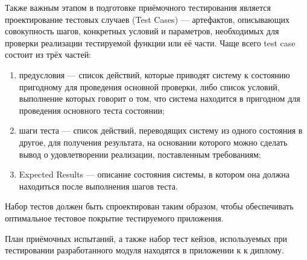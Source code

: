 Также важным этапом в подготовке приёмочного тестирования является проектирование тестовых случаев (Test Cases) ---
артефактов, описывающих совокупность шагов, конкретных условий и параметров, необходимых для проверки реализации
тестируемой функции или её части. Чаще всего test case состоит из трёх частей:

\begin{enumerate}
\item предусловия --- список действий, которые приводят систему к состоянию пригодному для проведения основной
проверки, либо список условий, выполнение которых говорит о том, что система находится в пригодном для проведения
основного теста состоянии;
\item шаги теста --- список действий, переводящих систему из одного состояния в другое, для получения
результата, на основании которого можно сделать вывод о удовлетворении реализации, поставленным требованиям;
\item Expected Results --- описание состояния системы, в котором она должна находиться после выполнения шагов теста.
\end{enumerate}

Набор тестов должен быть спроектирован таким образом, чтобы обеспечивать оптимальное тестовое покрытие тестируемого
приложения.

План приёмочных испытаний, а также набор тест кейзов, используемых при тестировании разработанного модуля находятся в приложении к 
к диплому.

